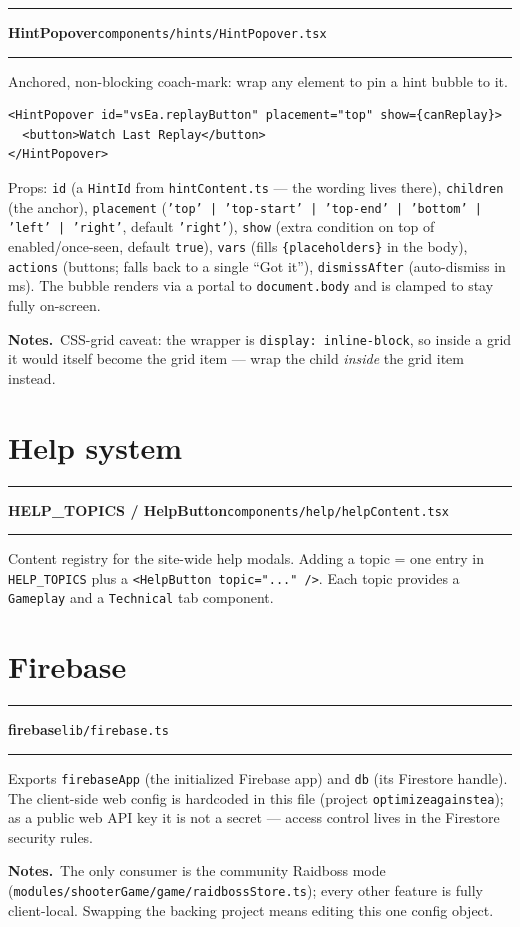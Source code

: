 \documentclass[11pt,a4paper]{report}
\newcommand{\srcfile}[1]{\texttt{\small #1}}   %
\newcommand{\ts}[1]{\texttt{#1}}               %
\newenvironment{apientry}[2]{%
  \par\medskip\noindent
  \begin{minipage}{\textwidth}
  \hrule\vspace{0.6ex}
  {\large\ttfamily\bfseries #1}\hfill{\footnotesize\srcfile{#2}}
  \vspace{0.4ex}\hrule\medskip
}{%
  \end{minipage}\par\medskip
}
\newcommand{\apifield}[1]{\par\smallskip\noindent\textbf{#1.}\ }
\begin{document}
\begin{apientry}{HintPopover}{components/hints/HintPopover.tsx}
Anchored, non-blocking coach-mark: wrap any element to pin a hint bubble
to it.
\begin{lstlisting}
<HintPopover id="vsEa.replayButton" placement="top" show={canReplay}>
  <button>Watch Last Replay</button>
</HintPopover>
\end{lstlisting}
Props: \ts{id} (a \ts{HintId} from \ts{hintContent.ts} --- the wording
lives there), \ts{children} (the anchor), \ts{placement}
(\ts{'top' | 'top-start' | 'top-end' | 'bottom' | 'left' | 'right'},
default \ts{'right'}), \ts{show} (extra condition on top of
enabled/once-seen, default \ts{true}), \ts{vars} (fills
\ts{\{placeholders\}} in the body), \ts{actions} (buttons; falls back to
a single ``Got it''), \ts{dismissAfter} (auto-dismiss in ms). The bubble
renders via a portal to \ts{document.body} and is clamped to stay fully
on-screen.
\apifield{Notes}CSS-grid caveat: the wrapper is \ts{display:
inline-block}, so inside a grid it would itself become the grid item ---
wrap the child \emph{inside} the grid item instead.
\end{apientry}

\section{Help system}

\begin{apientry}{HELP\_TOPICS / HelpButton}{components/help/helpContent.tsx}
Content registry for the site-wide help modals. Adding a topic = one entry
in \ts{HELP\_TOPICS} plus a \ts{<HelpButton topic="..." />}. Each topic
provides a \ts{Gameplay} and a \ts{Technical} tab component.
\end{apientry}

\section{Firebase}

\begin{apientry}{firebase}{lib/firebase.ts}
Exports \ts{firebaseApp} (the initialized Firebase app) and \ts{db} (its
Firestore handle). The client-side web config is hardcoded in this file
(project \ts{optimizeagainstea}); as a public web API key it is not a
secret --- access control lives in the Firestore security rules.
\apifield{Notes}The only consumer is the community Raidboss mode
(\srcfile{modules/shooterGame/game/raidbossStore.ts}); every other
feature is fully client-local. Swapping the backing project means
editing this one config object.
\end{apientry}
\end{document}

